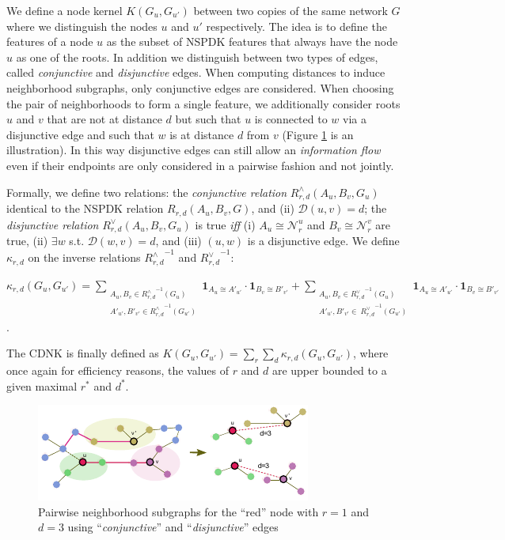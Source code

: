 \documentclass[review]{elsarticle}
\begin{document}
We define a node kernel $K(G_u,G_{u'})$ between two copies of the same network $G$ where we distinguish the nodes $u$ and $u'$ respectively. The idea is to define the features of a node $u$ as the subset of NSPDK features that always have the node $u$ as one of the roots. In addition we distinguish between two types of edges, called {\em conjunctive} and {\em disjunctive} edges. When computing distances to induce neighborhood subgraphs, only conjunctive edges are considered. When choosing the
pair of neighborhoods to form a single feature, we additionally consider roots $u$ and $v$ that are not at distance $d$ but such that $u$ is connected to $w$ via a disjunctive edge and such that $w$ is at distance $d$ from $v$ (Figure \ref{fig:cdnk} is an illustration). In this way disjunctive edges can still allow an {\em information flow} even if their
endpoints are only considered in a pairwise fashion and not jointly. 

Formally, we define two relations: the \textit{conjunctive relation} $R^{\wedge}_{r,d}(A_u, B_v, G_u)$ identical to the NSPDK relation $R_{r,d}(A_u, B_v, G)$,  and (ii) $\mathcal{D}(u,v)= d$; the \textit{disjunctive relation} $R_{r,d}^{\vee}(A_u, B_v, G_u)$ is true {\em iff} (i)  $A_u \cong \mathcal{N}_r^u$ and $B_v \cong \mathcal{N}_r^v$ are true, (ii) $\exists w$ s.t. $\mathcal{D}(w,v)= d$, and (iii) $(u,w)$ is a disjunctive edge. We define $\kappa_{r,d}$ on the  inverse relations ${R^{\wedge}_{r,d}}^{ -1}$ and ${R^{\vee}_{r,d}}^{ -1}$:
\begin{center}
 $\kappa_{r,d}(G_u,G_{u'}) = \!\!\!\!\!\!\!\!\!\!\!\!
 \sum\limits_{\substack {A_u,{B}_{v} \in {R_{r,d}^{\wedge}}^{ -1}(G_u) \\ A'_{u'},{B'}_{v'} \in {R_{r,d}^{\wedge}}^{ -1}(G_{u'}) }} \!\!\!\!\!\!\!\!\!\!\!\!
  { \textbf{1}_{A_u \cong A'_{u'}} \cdot { \textbf{1}_{B_{v} \cong B'_{v'}}}}
+ \!\!\!\!\!\!\!\!\!\!\!\!
 \sum\limits_{\substack {A_u,{B}_{v} \in {R_{r,d}^{\vee}}^{ -1}(G_u) \\
  A'_{u'},{B'}_{v'} \in \ {R_{r,d}^{\vee}}^{ -1}(G_{u'}) }} \!\!\!\!\!\!\!\!\!\!\!\!
  { \textbf{1}_{A_u \cong A'_{u'}} \cdot { \textbf{1}_{B_{v} \cong B'_{v'}}}}
  $.
\end{center}
The CDNK is finally defined as $K(G_u,G_{u'}) = \sum\limits_{r}{\sum\limits_{d}{\kappa_{r,d}(G_u,G_{u'})}}$, where once again for efficiency reasons, the values of $r$ and $d$ are upper bounded to a given maximal $r^*$ and $d^*$.

\begin{figure}
\centering
\includegraphics[width=.9\textwidth]{cdnk}
\caption{Pairwise neighborhood subgraphs for the ``red'' node with $r=1$ and $d=3$ using ``\textit{conjunctive}'' and ``\textit{disjunctive}'' edges}
\label{fig:cdnk}
\end{figure}
\end{document}
